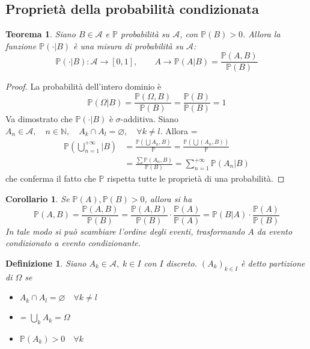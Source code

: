 \documentclass[a4paper,12pt]{article}
\theoremstyle{break}
\newtheorem{theorem}{Teorema}[section]
\newtheorem{corollary}{Corollario}[section]
\newtheorem{definition}{Definizione}[section]
\let\emptyset\varnothing
\numberwithin{equation}{section}
\begin{document}
\subsection{Proprietà della probabilità condizionata}
\begin{theorem}
  Siano \(B \in \mathcal{A}\) e \(\mathbb{P}\) probabilità su \(\mathcal{A}\), con \(\mathbb{P}(B) > 0\).
  Allora la funzione \(\mathbb{P}(\cdot |B)\) è una misura di probabilità su \(\mathcal{A}\):
  \[
    \mathbb{P}(\cdot |B) : \mathcal{A} \to [0,1], \qquad A \rightarrow \mathbb{P}(A|B) = \frac{\mathbb{P}(A,B)}{\mathbb{P}(B)}
  \]
\end{theorem}
\begin{proof}
  La probabilità dell'intero dominio è 
  \[
     \mathbb{P}(\Omega |B) = \frac{\mathbb{P}(\Omega, B)}{\mathbb{P}(B)} = \frac{\mathbb{P}(B)}{\mathbb{P}(B)} = 1
  \]
  Va dimostrato che \(\mathbb{P}(\cdot|B)\) è \(\sigma\)-additiva. Siano \(A_n \in \mathcal{A}, \quad n \in \mathbb{N}, \quad A_k \cap A_l = \emptyset, \quad \forall k \not = l\). Allora
  {\everymath = {\displaystyle}\[
    \begin{array}{ll}
      \mathbb{P}\left(\bigcup_{n=1}^{+\infty} \Bigg\vert B\right) & = \frac{\mathbb{P}(\bigcup A_n, B)}{\mathbb{P}} = \frac{\mathbb{P}(\bigcup(A_n, B))}{\mathbb{P}} \\
      & = \frac{\sum \mathbb{P}(A_n, B)}{\mathbb{P}(B)} = \sum_{n = 1}^{+\infty} \mathbb{P}(A_n\vert B) 
  \end{array}
  \]}
  che conferma il fatto che \(\mathbb{P}\) rispetta tutte le proprietà di una probabilità.
\end{proof}
\begin{corollary}
  Se \(\mathbb{P}(A), \mathbb{P}(B) > 0\), allora si ha
  \[
     \mathbb{P}(A,B) = \frac{\mathbb{P}(A,B)}{\mathbb{P}(B)} = \frac{\mathbb{P}(A,B)}{\mathbb{P}(B)} \cdot \frac{\mathbb{P}(A)}{\mathbb{P}(A)} = \mathbb{P}(B|A) \cdot \frac{\mathbb{P}(A)}{\mathbb{P}(B)}
  \]
  In tale modo si può scambiare l'ordine degli eventi, trasformando \(A\) da evento condizionato a evento condizionante. 
\end{corollary}
\begin{definition}
  Siano \(A_k \in \mathcal{A}, \; k \in I\) con \(I\) discreto. \((A_k)_{k\in I}\) è detto partizione di \(\Omega\) se 
  \begin{itemize}
    \item \(A_k \cap A_l = \emptyset \quad \forall k \not = l\)
    \item {\everymath = {\displaystyle}\(\bigcup_{k} A_k = \Omega\)}
    \item \(\mathbb{P}(A_k) > 0 \quad \forall k\)
  \end{itemize}
\end{definition}
\end{document}
